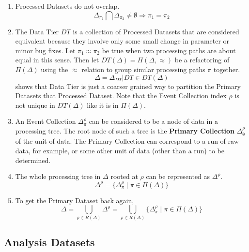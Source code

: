 \documentclass{cmspaper}
\begin{document}
\begin{enumerate}
\item Processed Datasets do not overlap.  
\begin{equation}
\Delta_{\pi_1} \bigcap \Delta_{\pi_2} \not= \emptyset \Rightarrow \pi_1 = \pi_2
\end{equation}

\item The Data Tier $DT$ is a collection of Processed Datasets that are considered equivalent
because they involve only some small change in parameter or minor bug fixes.  Let $\pi_1 \approx \pi_2$ 
be true when two processing paths are about equal in this sense.  Then let 
$DT(\Delta) = \Pi(\Delta,\approx)$ be 
a refactoring of $\Pi(\Delta)$ using the $\approx$ relation to group similar processing
paths $\pi$ together.  
\begin{equation}
\Delta = {\Delta_{DT} | DT \in DT(\Delta)}
\end{equation}
shows that Data Tier is just a coarser grained way to partition the Primary Datasets that 
Processed Dataset.  Note that the Event Collection index $\rho$ is not unique in $DT(\Delta)$ like
it is in $\Pi(\Delta)$.

\item An Event Collection $\Delta_{\pi}^{\rho}$ can 
be considered to be a node of data in a processing tree.  
The root node of such a tree is the {\bf Primary Collection} $\Delta_{\emptyset}^{\rho}$ 
of the unit of data.  The Primary Collection can correspond to a 
run of raw data, for example, or some other unit of data 
(other than a run) to be determined.  

\item The whole processing tree in $\Delta$ rooted 
at $\rho$ can be represented as $\Delta^{\rho}$. 
\begin{equation}
\Delta^{\rho} = \{ \Delta_{\pi}^{\rho} \mid \pi \in \Pi(\Delta) \}
\end{equation}

\item To get the Primary Dataset back again, 
\begin{equation}
\Delta = \bigcup_{\rho \in R(\Delta)} \Delta^{\rho} = \bigcup_{\rho \in R(\Delta)} \{ \Delta_{\pi}^{\rho} \mid \pi \in \Pi(\Delta) \} 
\end{equation}

\end{enumerate}


\subsection{Analysis Datasets}
\end{document}
